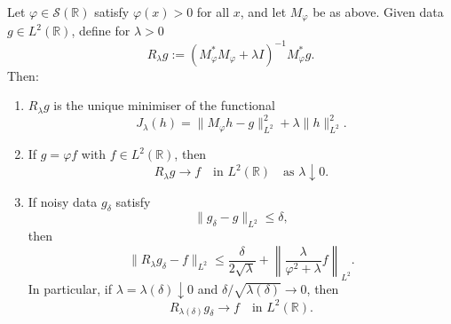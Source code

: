 \documentclass[10pt,a4paper]{amsart}
\newcommand{\R}{\mathbb{R}}
\begin{document}
\begin{theorem}
\label{thm:tikhonov-reconstruction}
Let $\varphi\in\mathcal{S}(\R)$ satisfy $\varphi(x)>0$ for all $x$, and
let $M_\varphi$ be as above. Given data $g\in L^2(\R)$, define for
$\lambda>0$
\[
R_\lambda g
:=
(M_\varphi^* M_\varphi + \lambda I)^{-1} M_\varphi^* g.
\]
Then:

\begin{enumerate}
\item $R_\lambda g$ is the unique minimiser of the functional
\[
J_\lambda(h)
=
\|M_\varphi h - g\|_{L^2}^2
+
\lambda \|h\|_{L^2}^2.
\]

\item If $g = \varphi f$ with $f\in L^2(\R)$, then
\[
R_\lambda g \to f
\quad\text{in }L^2(\R)
\quad\text{as }\lambda\downarrow 0.
\]

\item If noisy data $g_\delta$ satisfy
\[
\|g_\delta - g\|_{L^2} \le \delta,
\]
then
\[
\|R_\lambda g_\delta - f\|_{L^2}
\le
\frac{\delta}{2\sqrt{\lambda}}
+
\left\|
\frac{\lambda}{\varphi^2 + \lambda} f
\right\|_{L^2}.
\]
In particular, if $\lambda=\lambda(\delta)\downarrow 0$ and
$\delta/\sqrt{\lambda(\delta)}\to 0$, then
\[
R_{\lambda(\delta)} g_\delta \to f
\quad\text{in }L^2(\R).
\]
\end{enumerate}
\end{theorem}
\end{document}
